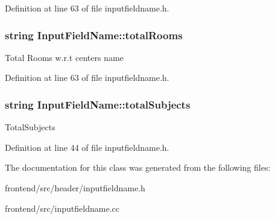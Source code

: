 \-Definition at line 63 of file inputfieldname.\-h.

\hypertarget{classInputFieldName_a51fe8230341d7863ffd4672f2c986beb}{
\subsubsection[{total\-Rooms}]{\setlength{\rightskip}{0pt plus 5cm}string {\bf \-Input\-Field\-Name\-::total\-Rooms}}}\label{dd/db2/classInputFieldName_a51fe8230341d7863ffd4672f2c986beb}
\-Total \-Rooms w.\-r.\-t centers name 

\-Definition at line 63 of file inputfieldname.\-h.

\hypertarget{classInputFieldName_ac58130077f39d82aaf447b1a67e9f70f}{
\subsubsection[{total\-Subjects}]{\setlength{\rightskip}{0pt plus 5cm}string {\bf \-Input\-Field\-Name\-::total\-Subjects}}}\label{dd/db2/classInputFieldName_ac58130077f39d82aaf447b1a67e9f70f}
\-Total\-Subjects 

\-Definition at line 44 of file inputfieldname.\-h.



\-The documentation for this class was generated from the following files\-:\begin{DoxyCompactItemize}
\item 
frontend/src/header/inputfieldname.\-h\item 
frontend/src/inputfieldname.\-cc\end{DoxyCompactItemize}
